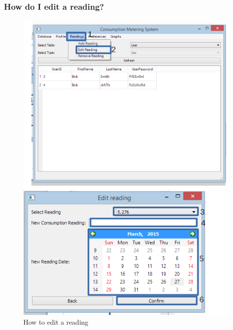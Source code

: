 \subsubsection{How do I edit a reading?}\label{question:edit_reading}
\begin{figure}[H]
	\includegraphics{./manual/images/edit_reading.png}
	\caption{How to edit a reading}
\end{figure}

